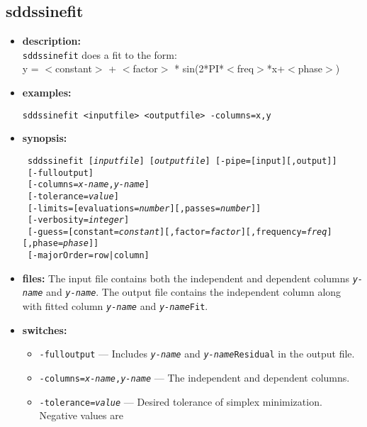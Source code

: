 \newpage 
\subsection{sddssinefit} 
\label{sddssinefit} 
 
\begin{itemize} 
\item {\bf description:} \hspace*{1mm}\\ 
{\tt sddssinefit} does a fit to the form:\\
y = $<$constant$>$ + $<$factor$>$ * sin(2*PI*$<$freq$>$*x+$<$phase$>$)
\item {\bf examples:} 
\begin{flushleft}
{\tt sddssinefit <inputfile> <outputfile> -columns=x,y }
\end{flushleft} 
\item {\bf synopsis:}  
\begin{flushleft}
{\tt 
sddssinefit [{\em inputfile}] [{\em outputfile}] [-pipe=[input][,output]] \\ \
[-fulloutput] \\ \
[-columns={\em x-name},{\em y-name}] \\ \
[-tolerance={\em value}] \\ \
[-limits=[evaluations={\em number}][,passes={\em number}]] \\ \
[-verbosity={\em integer}] \\ \
[-guess=[constant={\em constant}][,factor={\em factor}][,frequency={\em freq}][,phase={\em phase}]] \\ \
[-majorOrder=row|column]}
\end{flushleft} 
\item {\bf files:} 
The input file contains both the independent and dependent columns {\tt {\em y-name}} and {\tt {\em y-name}}. The output file contains the independent column along with fitted column {\tt {\em y-name}} and {\tt {\em y-name}Fit}.
\item {\bf switches:} 
    \begin{itemize} 
    \item {\tt -fulloutput} --- Includes {\tt {\em y-name}} and {\tt {\em y-name}Residual} in the output file.
    \item {\tt -columns={\em x-name},{\em y-name}} --- The independent and dependent columns.
    \item {\tt -tolerance={\em value}} --- Desired tolerance of simplex minimization. Negative values are\\

\end{itemize}
\end{itemize}
